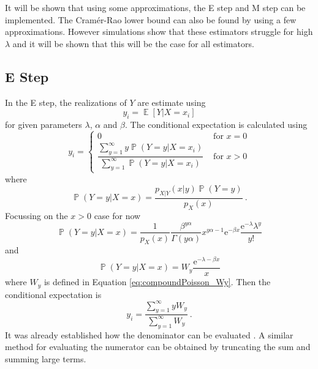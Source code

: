 \documentclass[12pt, a4paper]{memoir}
\DeclareMathOperator{\expectation}{\mathbb{E}}
\DeclareMathOperator{\prob}{\mathbb{P}}
\newcommand{\euler}{\mathrm{e}}
\begin{document}
It will be shown that using some approximations, the E step and M step can be implemented. The Cram\'er-Rao lower bound \citep{rao1945information} \citep{cramer1946mathematical} can also be found by using a few approximations. However simulations show that these estimators struggle for high $\lambda$ and it will be shown that this will be the case for all estimators.

\subsection{E Step}

In the E step, the realizations of $Y$ are estimate using
\begin{equation}
	y_i =
	\expectation\left[
		Y|X=x_i
	\right]
\end{equation}
for given parameters $\lambda$, $\alpha$ and $\beta$. The conditional expectation is calculated using
\begin{equation}
	y_i = 
	\begin{cases}
		0 & \text{ for } x=0 \\ 
		\dfrac{\sum_{y=1}^\infty y \prob(Y=y|X=x_i)}{\sum_{y=1}^\infty \prob(Y=y|X=x_i)} & \text{ for } x>0
	\end{cases}
\end{equation}
where
\begin{equation*}
	\prob(Y=y|X=x) = \frac{p_{X|Y}(x|y)\prob(Y=y)}{p_X(x)}
	\ .
\end{equation*}
Focussing on the $x>0$ case for now
\begin{equation*}
	\prob(Y=y|X=x) = \frac{1}{p_X(x)}\frac{\beta^{y\alpha}}{\Gamma(y\alpha)}x^{y\alpha-1}\euler^{-\beta x}\frac{\euler^{-\lambda}\lambda^y}{y!}
\end{equation*}
and
\begin{equation}
	\prob(Y=y|X=x) = W_y \frac{\euler^{-\lambda-\beta x}}{x}
\end{equation}
where $W_y$ is defined in Equation \eqref{eq:compoundPoisson_Wy}.
Then the conditional expectation is
\begin{equation}
	y_i = \frac{\sum_{y=1}^\infty y W_y}{\sum_{y=1}^\infty W_y}
	\ .
\end{equation}
It was already established how the denominator can be evaluated \citep{dunn2005series}. A similar method for evaluating the numerator can be obtained by truncating the sum and summing large terms.
\end{document}
